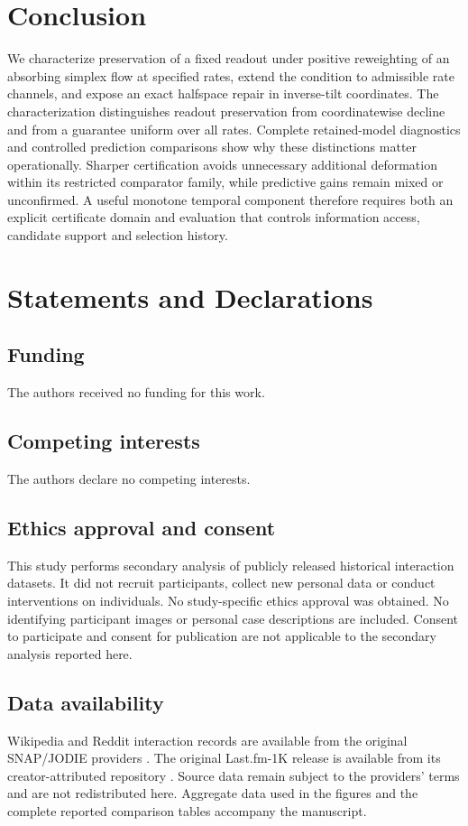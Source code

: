 \documentclass[pdflatex,sn-vancouver-num]{sn-jnl}
\theoremstyle{thmstyleone}
\begin{document}
\section{Conclusion}
We characterize preservation of a fixed readout under positive reweighting of an absorbing simplex flow at specified rates, extend the condition to admissible rate channels, and expose an exact halfspace repair in inverse-tilt coordinates. The characterization distinguishes readout preservation from coordinatewise decline and from a guarantee uniform over all rates. Complete retained-model diagnostics and controlled prediction comparisons show why these distinctions matter operationally. Sharper certification avoids unnecessary additional deformation within its restricted comparator family, while predictive gains remain mixed or unconfirmed. A useful monotone temporal component therefore requires both an explicit certificate domain and evaluation that controls information access, candidate support and selection history.

\section*{Statements and Declarations}
\subsection*{Funding}
The authors received no funding for this work.
\subsection*{Competing interests}
The authors declare no competing interests.
\subsection*{Ethics approval and consent}
This study performs secondary analysis of publicly released historical interaction datasets. It did not recruit participants, collect new personal data or conduct interventions on individuals. No study-specific ethics approval was obtained. No identifying participant images or personal case descriptions are included. Consent to participate and consent for publication are not applicable to the secondary analysis reported here.
\subsection*{Data availability}
Wikipedia and Reddit interaction records are available from the original SNAP/JODIE providers \cite{jodie}. The original Last.fm-1K release is available from its creator-attributed repository \cite{lastfm}. Source data remain subject to the providers' terms and are not redistributed here. Aggregate data used in the figures and the complete reported comparison tables accompany the manuscript.
\end{document}
